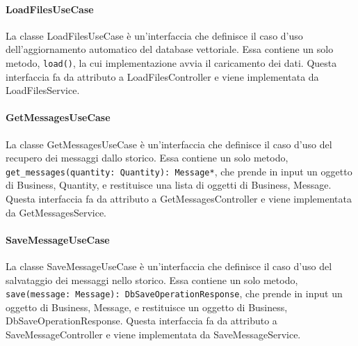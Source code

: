 \paragraph{LoadFilesUseCase}
\label{sec:load_files_use_case}
La classe LoadFilesUseCase è un'interfaccia che definisce il caso d'uso dell'aggiornamento automatico del database vettoriale. Essa contiene un solo metodo, \texttt{load()}, la cui implementazione avvia il caricamento dei dati. Questa interfaccia fa da attributo a LoadFilesController e viene implementata da LoadFilesService.

\paragraph{GetMessagesUseCase}
\label{sec:get_messages_use_case}
La classe GetMessagesUseCase è un'interfaccia che definisce il caso d'uso del recupero dei messaggi dallo storico. Essa contiene un solo metodo, \texttt{get\_messages(quantity: Quantity): Message*}, che prende in input un oggetto di Business, Quantity, e restituisce una lista di oggetti di Business, Message. Questa interfaccia fa da attributo a GetMessagesController e viene implementata da GetMessagesService.

\paragraph{SaveMessageUseCase}
\label{sec:save_message_use_case}
La classe SaveMessageUseCase è un'interfaccia che definisce il caso d'uso del salvataggio dei messaggi nello storico. Essa contiene un solo metodo, \texttt{save(message: Message): DbSaveOperationResponse}, che prende in input un oggetto di Business, Message, e restituisce un oggetto di Business, DbSaveOperationResponse. Questa interfaccia fa da attributo a SaveMessageController e viene implementata da SaveMessageService.

\newpage


\label{sec:service_backend}

